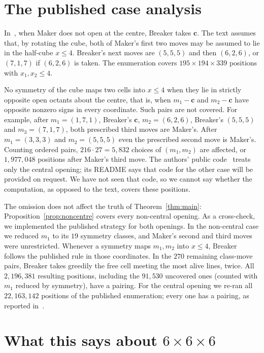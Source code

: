 \documentclass[11pt]{amsart}
\theoremstyle{definition}
\theoremstyle{remark}
\newcommand{\cc}{\mathbf c}
\begin{document}
\section{The published case analysis}\label{sec:gap}

In~\cite[Sec.~4.3]{CRK2025}, when Maker does not open at the centre, Breaker takes $\cc$. The text assumes that, by rotating the cube, both of Maker's first two moves may be assumed to lie in the half-cube $x\le4$. Breaker's next moves are $(5,5,5)$ and then $(6,2,6)$, or $(7,1,7)$ if $(6,2,6)$ is taken. The enumeration covers $195\times194\times339$ positions with $x_1,x_2\le4$.

No symmetry of the cube maps two cells into $x\le4$ when they lie in strictly opposite open octants about the centre, that is, when $m_1-\cc$ and $m_2-\cc$ have opposite nonzero signs in every coordinate. Such pairs are not covered. For example, after $m_1=(1,7,1)$, Breaker's $\cc$, $m_2=(6,2,6)$, Breaker's $(5,5,5)$ and $m_3=(7,1,7)$, both prescribed third moves are Maker's. After $m_1=(3,3,3)$ and $m_2=(5,5,5)$ even the prescribed second move is Maker's. Counting ordered pairs, $216\cdot27=5{,}832$ choices of $(m_1,m_2)$ are affected, or $1{,}977{,}048$ positions after Maker's third move. The authors' public code~\cite{CRKcode} treats only the central opening; its README says that code for the other case will be provided on request. We have not seen that code, so we cannot say whether the computation, as opposed to the text, covers these positions.

The omission does not affect the truth of Theorem~\ref{thm:main}: Proposition~\ref{prop:noncentre} covers every non-central opening. As a cross-check, we implemented the published strategy for both openings. In the non-central case we reduced $m_1$ to its $19$ symmetry classes, and Maker's second and third moves were unrestricted. Whenever a symmetry maps $m_1,m_2$ into $x\le4$, Breaker follows the published rule in those coordinates. In the $270$ remaining class-move pairs, Breaker takes greedily the free cell meeting the most alive lines, twice. All $2{,}196{,}381$ resulting positions, including the $91{,}530$ uncovered ones (counted with $m_1$ reduced by symmetry), have a pairing. For the central opening we re-ran all $22{,}163{,}142$ positions of the published enumeration; every one has a pairing, as reported in~\cite{CRK2025}.

\section{What this says about \texorpdfstring{$6\times6\times6$}{6x6x6}}\label{sec:six}
\end{document}
